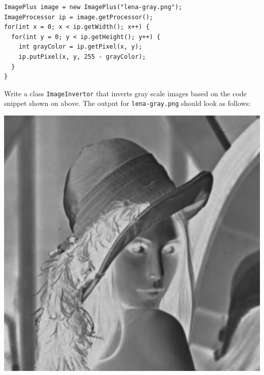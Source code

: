 \documentclass{book}
\begin{document}
\begin{lstlisting}
ImagePlus image = new ImagePlus("lena-gray.png");
ImageProcessor ip = image.getProcessor();
for(int x = 0; x < ip.getWidth(); x++) {
  for(int y = 0; y < ip.getHeight(); y++) {
    int grayColor = ip.getPixel(x, y);
    ip.putPixel(x, y, 255 - grayColor);
  }  
}
\end{lstlisting}

\begin{exercise}\label{ex:invert}
Write a class \texttt{ImageInvertor} that inverts gray scale images based on the code snippet shown on above. The output for \texttt{lena-gray.png} should look as follows:
\begin{center}
\includegraphics[scale=0.2]{lena-gray-inverted.png}
\end{center}
\end{exercise}
\end{document}
